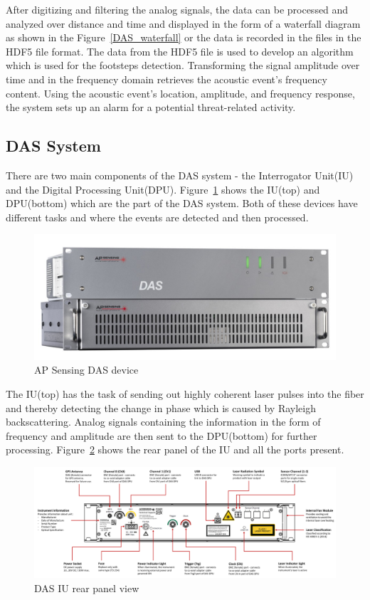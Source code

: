 After digitizing and filtering the analog signals, the data can be processed and analyzed over distance and time and displayed in the form of a waterfall diagram as shown in the Figure~\ref{DAS_waterfall} or the data is recorded in the files in the HDF5 file format. The data from the HDF5 file is used to develop an algorithm which is used for the footsteps detection. Transforming the signal amplitude over time and in the frequency domain retrieves the acoustic event's frequency content. Using the acoustic event's location, amplitude, and frequency response, the system sets up an alarm for a potential threat-related activity. 

\subsection{DAS System}
There are two main components of the DAS system - the Interrogator Unit(IU) and the Digital Processing Unit(DPU). Figure~\ref{DAS} shows the IU(top) and DPU(bottom) which are the part of the DAS system. Both of these devices have different tasks and where the events are detected and then processed.

\begin{figure}[h]
    \centering
    \includegraphics[width=\linewidth]{Bilder/jpg/DAS.jpg}
    \caption{AP Sensing DAS device~\cite{DAS_Manual}}
    \label{DAS}
\end{figure}

The IU(top) has the task of sending out highly coherent laser pulses into the fiber and thereby detecting the change in phase which is caused by Rayleigh backscattering. Analog signals containing the information in the form of frequency and amplitude are then sent to the DPU(bottom) for further processing. Figure~\ref{IU} shows the rear panel of the IU and all the ports present.

\begin{figure}[h]
    \centering
    \includegraphics[width=\linewidth]{Bilder/jpg/DAS IU Technical Description.png}
    \caption{DAS IU rear panel view~\cite{DAS_Manual}}
    \label{IU}
\end{figure}

